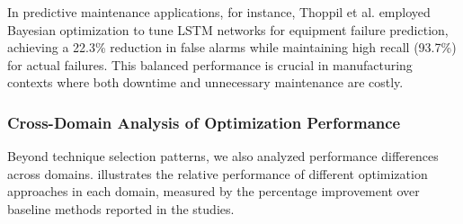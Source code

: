 \documentclass[acmsmall]{acmart}
\begin{document}
In predictive maintenance applications, for instance, Thoppil et al. \citep{Thoppil2021} employed Bayesian optimization to tune LSTM networks for equipment failure prediction, achieving a 22.3\% reduction in false alarms while maintaining high recall (93.7\%) for actual failures. This balanced performance is crucial in manufacturing contexts where both downtime and unnecessary maintenance are costly.

\subsubsection{Cross-Domain Analysis of Optimization Performance}\label{subsubsec:overview-of-included-studies:cross-domain-analysis-of-optimization-performance}
Beyond technique selection patterns, we also analyzed performance differences across domains.  illustrates the relative performance of different optimization approaches in each domain, measured by the percentage improvement over baseline methods reported in the studies.
\end{document}
